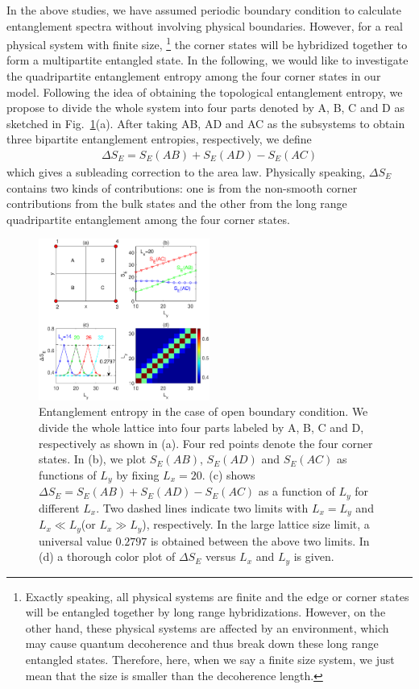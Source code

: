\documentclass[twocolumn,superscriptaddress]{revtex4-1}
\begin{document}
In the above studies, we have assumed periodic boundary condition to calculate entanglement spectra without involving physical boundaries. However, for a real physical system with finite size, \footnote{Exactly speaking, all physical systems are finite and the edge or corner states will be entangled together by long range hybridizations. However, on the other hand, these physical systems are affected by an environment, which may cause quantum decoherence and thus break down these long range entangled states. Therefore, here, when we say a finite size system, we just mean that the size is smaller than the decoherence length.} the corner states will be hybridized together to form a multipartite entangled state. In the following, we would like to investigate the quadripartite entanglement entropy among the four corner states in our model. Following the idea of obtaining the topological entanglement entropy, \cite{Kitaev_PRL_2006, Levin_PRL_2006} we propose to divide the whole system into four parts denoted by A, B, C and D as sketched in Fig.~\ref{fig:quadripartite}(a). After taking AB, AD and AC as the subsystems to obtain three bipartite entanglement entropies, respectively, we define
\begin{eqnarray}
  \Delta S_E=S_E(AB)+S_E(AD)-S_E(AC)
\end{eqnarray}
which gives a subleading correction to the area law. Physically speaking, $\Delta S_E$ contains two kinds of contributions: one is from the non-smooth corner contributions from the bulk states and the other from the long range quadripartite entanglement among the four corner states.

\begin{figure}
    \includegraphics[width=0.5\textwidth]{quadripartite.eps}
    \caption{\label{fig:quadripartite} Entanglement entropy in the case of open boundary condition. We divide the whole lattice into four parts labeled by A, B, C and D, respectively as shown in (a). Four red points denote the four corner states. In (b), we plot $S_E(AB)$, $S_E(AD)$ and $S_E(AC)$ as functions of $L_y$ by fixing $L_x=20$. (c) shows $\Delta S_E=S_E(AB)+S_E(AD)-S_E(AC)$ as a function of $L_y$ for different $L_x$. Two dashed lines indicate two limits with $L_x=L_y$ and $L_x\ll L_y$(or $L_x\gg L_y$), respectively. In the large lattice size limit, a universal value $0.2797$ is obtained between the above two limits. In (d) a thorough color plot of $\Delta S_E$ versus $L_x$ and $L_y$ is given.}
\end{figure}
\end{document}
